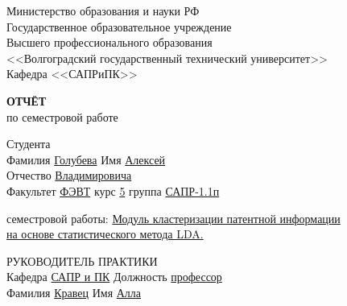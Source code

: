 \documentclass[a4paper, 14pt]{extreport}
\begin{document}
    \begin{titlepage}
        \begin{center}
            Министерство образования и науки РФ \\
            Государственное образовательное учреждение\\
            Высшего профессионального образования\\
            <<Волгоградский государственный технический университет>>\\
            Кафедра <<САПРиПК>>
        \end{center}
        \vspace{2.0cm}
        \begin{center}
            \large \textbf{ОТЧЁТ} \\
            по семестровой работе
        \end{center}
        \begin{flushleft}
            Студента\\
            Фамилия \underline{Голубева\hspace{3cm}} 
            Имя \underline{Алексей\hspace{3cm}}\\
            Отчество \underline{Владимировича\hspace{1.5cm}}\\
            Факультет \underline{ФЭВТ\hspace{3.3cm}} курс \underline{5\hspace{1cm}} 
            группа \underline{САПР-1.1п\hspace{2.1cm}}
        \end{flushleft}
        \vspace{1.0cm}
         семестровой работы: \underline{Модуль кластеризации патентной информации}\\
        \underline{на основе статистического метода LDA.\hspace{7.4cm}}
        \vspace{2.0cm}
        \begin{flushleft}
            РУКОВОДИТЕЛЬ ПРАКТИКИ\\
            Кафедра \underline{САПР и ПК\hspace{3cm}} Должность \underline{профессор\hspace{3cm}} \\
            Фамилия \underline{Кравец\hspace{3.9cm}} Имя \underline{Алла\hspace{3cm}}\\

\end{flushleft}
\end{titlepage}
\end{document}
